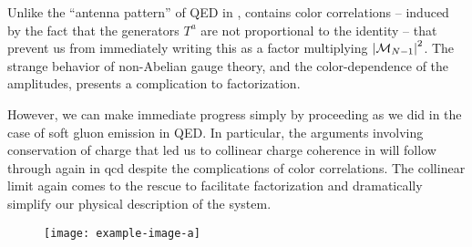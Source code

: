 Unlike the ``antenna pattern'' of QED in ,  contains color correlations -- induced by the fact that the generators \(T^a\) are not proportional to the identity -- that prevent us from immediately writing this as a factor multiplying \(\abs{\mathcal{M}_{N-1}}^2\).
%
The strange behavior of non-Abelian gauge theory, and the color-dependence of the amplitudes, presents a complication to factorization.

However, we can make immediate progress simply by proceeding as we did in the case of soft gluon emission in QED.
%
In particular, the arguments involving conservation of charge that led us to collinear charge coherence in  will follow through again in \gls{qcd} despite the complications of color correlations.
%
The collinear limit again comes to the rescue to facilitate factorization and dramatically simplify our physical description of the system.

\begin{figure}[]
    \centering
    \texttt{[image: example-image-a]}
    \caption{
    }
    \label{fig:qcd-coherent-branching}
\end{figure}


